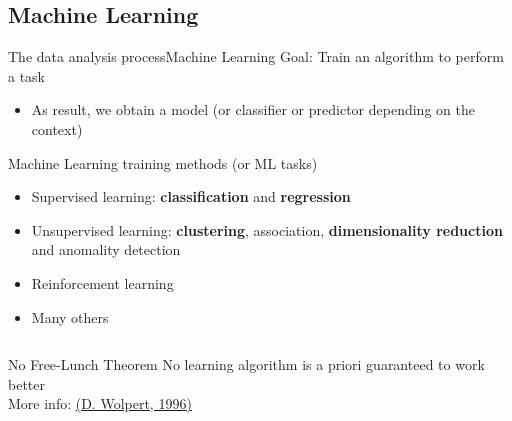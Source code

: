 \documentclass[10pt,compress]{beamer} %
\begin{document}
\subsection{Machine Learning}
\begin{frame}{The data analysis process}{Machine Learning}
	Goal: Train an algorithm to perform a task
		\begin{itemize}
		\item As result, we obtain a \alert{model} (or \alert{classifier} or \alert{predictor} depending on the context)
		\end{itemize}

	Machine Learning training methods (or ML tasks)
		\begin{itemize}
		\item Supervised learning: \textbf{classification} and \textbf{regression}
		\item Unsupervised learning: \textbf{clustering}, association, \textbf{dimensionality reduction} and anomality detection
        \item Reinforcement learning
		\item Many others
		\end{itemize}

	\vspace{-0.5cm}
	 \begin{flushright}
		\begin{columns}
		\begin{block}{No Free-Lunch Theorem}
		No learning algorithm is a priori guaranteed to work better\\
		More info: \href{http://citeseerx.ist.psu.edu/viewdoc/download?doi=10.1.1.390.9412&rep=rep1&type=pdf}{(D. Wolpert, 1996)}
		\end{block}
		\end{columns}
	 \end{flushright}

\end{frame}
\end{document}
